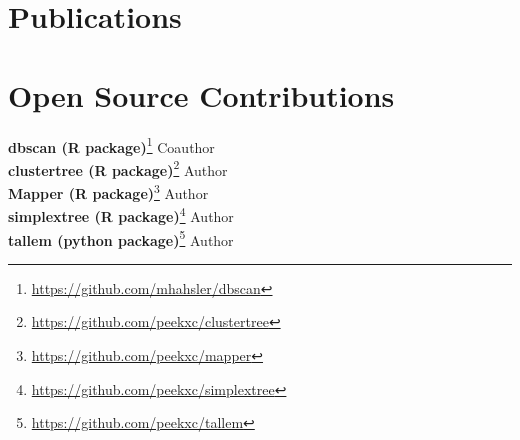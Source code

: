 \documentclass[11pt,a4paper,sans]{moderncv} %
\begin{document}
\section{Publications}









\section{Open Source Contributions}\label{sec:opensrc}
{\bfseries dbscan (R package)}\footnote{\url{https://github.com/mhahsler/dbscan}} \hfill Coauthor \\
{\bfseries clustertree (R package)}\footnote{\url{https://github.com/peekxc/clustertree}} \hfill Author \\ 
{\bfseries Mapper (R package)}\footnote{\url{https://github.com/peekxc/mapper}} \hfill Author  \\
{\bfseries simplextree (R package)}\footnote{\url{https://github.com/peekxc/simplextree}} \hfill Author \\
{\bfseries tallem (python package)}\footnote{\url{https://github.com/peekxc/tallem}} \hfill Author 
\end{document}
